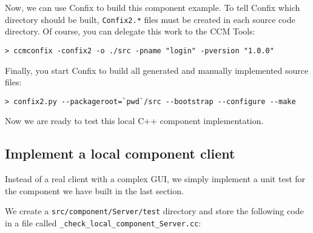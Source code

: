 Now, we can use Confix to build this component example. To tell Confix which
directory should be built, {\tt Confix2.*} files must be created in each
source code directory.
Of course, you can delegate this work to the CCM Tools:
\begin{footnotesize}
\begin{verbatim}
> ccmconfix -confix2 -o ./src -pname "login" -pversion "1.0.0"
\end{verbatim}
\end{footnotesize} 

Finally, you start Confix to build all generated and manually implemented source
files:
\begin{footnotesize}
\begin{verbatim}
> confix2.py --packageroot=`pwd`/src --bootstrap --configure --make 
\end{verbatim}
\end{footnotesize}

Now we are ready to test this local C++ component implementation.


\subsection{Implement a local component client}
\label{subsection:ImplementLocalComponentClient}

Instead of a real client with a complex GUI, we simply implement a unit test for
the component we have built in the last section.

\vspace{3mm}
We create a {\tt src/component/Server/test} directory and store the following
code in a file called {\tt \_check\_local\_component\_Server.cc}:
 
